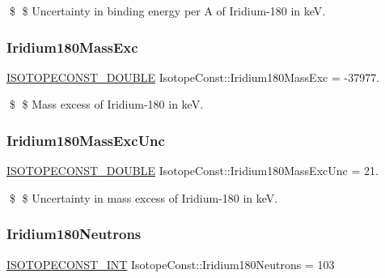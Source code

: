 \$ \$ Uncertainty in binding energy per A of Iridium-\/180 in keV. \mbox{\label{group___isotope_const-_iridium-_ir180_ga2b34acb765f5fc04ced3cbcc1fa2006c}} 
\subsubsection{\texorpdfstring{Iridium180\+Mass\+Exc}{Iridium180MassExc}}
{\footnotesize\ttfamily \mbox{\hyperlink{group___isotope_const-_macros_ga8f45a7272ce02c0b4c65c44636ed719a}{I\+S\+O\+T\+O\+P\+E\+C\+O\+N\+S\+T\+\_\+\+D\+O\+U\+B\+LE}} Isotope\+Const\+::\+Iridium180\+Mass\+Exc = -\/37977.}

\$ \$ Mass excess of Iridium-\/180 in keV. \mbox{\label{group___isotope_const-_iridium-_ir180_ga433131cd6d710c049daf7c14536617db}} 
\subsubsection{\texorpdfstring{Iridium180\+Mass\+Exc\+Unc}{Iridium180MassExcUnc}}
{\footnotesize\ttfamily \mbox{\hyperlink{group___isotope_const-_macros_ga8f45a7272ce02c0b4c65c44636ed719a}{I\+S\+O\+T\+O\+P\+E\+C\+O\+N\+S\+T\+\_\+\+D\+O\+U\+B\+LE}} Isotope\+Const\+::\+Iridium180\+Mass\+Exc\+Unc = 21.}

\$ \$ Uncertainty in mass excess of Iridium-\/180 in keV. \mbox{\label{group___isotope_const-_iridium-_ir180_ga670c050193274350526068b340fb0653}} 
\subsubsection{\texorpdfstring{Iridium180\+Neutrons}{Iridium180Neutrons}}
{\footnotesize\ttfamily \mbox{\hyperlink{group___isotope_const-_macros_ga5f18360b3e99483a35c32d789e62621c}{I\+S\+O\+T\+O\+P\+E\+C\+O\+N\+S\+T\+\_\+\+I\+NT}} Isotope\+Const\+::\+Iridium180\+Neutrons = 103}

